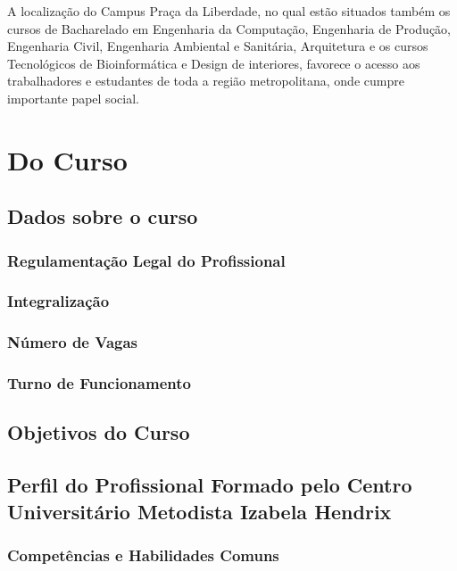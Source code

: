 \documentclass[a4paper, 12pt, openright, oneside, german, french, english, brazil]{abntex2}
\begin{document}
A localização do Campus Praça da Liberdade, no qual estão situados também os cursos de Bacharelado em Engenharia da Computação, Engenharia de Produção, Engenharia Civil, Engenharia Ambiental e Sanitária, Arquitetura e os cursos Tecnológicos de Bioinformática e Design de interiores, favorece o acesso aos trabalhadores e estudantes de toda a região metropolitana, onde cumpre importante papel social.


\part{Do Curso}

\chapter{Dados sobre o curso}

\section{Regulamentação Legal do Profissional}

\section{Integralização}

\section{Número de Vagas}

\section{Turno de Funcionamento}



\chapter{Objetivos do Curso}

\chapter{Perfil do Profissional Formado pelo Centro Universitário Metodista Izabela Hendrix}

\section{Competências e Habilidades Comuns}
\end{document}
